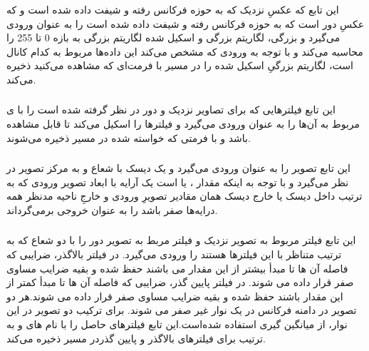 \documentclass[a4paper,12pt]{article}
\begin{document}
 \subsubsection*{}
 این تابع 
 که عکسِ نزدیک  که به حوزه فرکانس رفته و شیفت داده شده است و
 که عکسِ دور است که به حوزه فرکانس رفته و شیفت داده شده است را به عنوان ورودی می‌گیرد و بزرگی، لگاریتم بزرگی و اسکیل شده لگاریتم بزرگی به بازه 0 تا 255 را محاسبه می‌کند و با توجه به ورودی 
 که مشخص می‌کند این داده‌ها مربوط به کدام کانال است، لگاریتم بزرگیِ اسکیل شده را در مسیر
 با فرمت‌ای که مشاهده می‌کنید ذخیره می‌کند.
 \subsubsection*{}
 این تابع فیلترهایی که برای تصاویر نزدیک و دور در نظر گرفته شده است را با 
 ی مربوط به آن‌ها را به عنوان ورودی می‌گیرد و فیلتر‌ها را اسکیل می‌کند تا قابل مشاهده باشد و با فرمتی که خواسته شده در مسیر 
 ذخیره می‌شوند.
 \subsubsection*{}
 این تابع تصویر
 را به عنوان ورودی می‌گیرد و یک دیسک با شعاع
 و به مرکز تصویر در نظر می‌گیرد و با توجه به اینکه مقدار 
 ،
 یا
 است یک آرایه با ابعاد تصویر ورودی که به ترتیب داخل دیسک یا خارج دیسک همان مقادیر تصویرِ ورودی و خارجِ  ناحیه مدنظر همه درایه‌ها صفر باشد را به عنوان خروجی ‌برمی‌گرداند.
 \subsubsection*{}
 این تابع فیلتر مربوط به تصویر نزدیک و فیلتر مربط به تصویر دور را با دو شعاع که به ترتیب متناظر با این فیلتر‌ها هستند را ورودی می‌گیرد. در فیلتر بالاگذر، ضرایبی که فاصله آن ها تا مبدأ بیشتر از این مقدار 
  می باشند حفظ شده و بقیه ضرایب مساوی صفر قرار داده می شوند. در فیلتر پایین گذر، ضرایبی که فاصله آن ها تا مبدأ کمتر از این مقدار
   باشند
 حفظ شده و بقیه ضرایب مساوی صفر قرار داده می شوند.هر دو تصویر در دامنه فرکانس در یک نوار غیر صفر می شوند. برای ترکیب دو تصویر در این نوار، از میانگین گیری استفاده شده‌است.این تابع فیلترهای حاصل
 را با نام های 
  و 
   به ترتیب برای فیلترهای بالاگذر
 و پایین گذردر مسیر
 ذخیره می‌کند.
\end{document}
